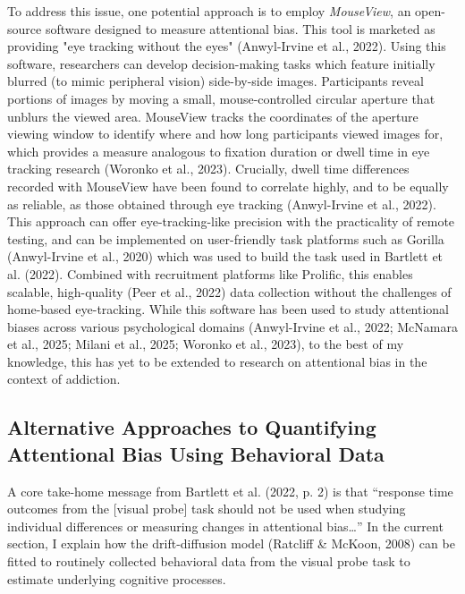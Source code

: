 \documentclass[authordate, reflection, issue]{jote-new-article}
\begin{document}
	To address this issue, one potential approach is to employ \emph{MouseView}, an open-source software designed to measure attentional bias. This tool is marketed as providing "eye tracking without the eyes" (Anwyl-Irvine et al., 2022). Using this software, researchers can develop decision-making tasks which feature initially blurred (to mimic peripheral vision) side-by-side images. Participants reveal portions of images by moving a small, mouse-controlled circular aperture that unblurs the viewed area. MouseView tracks the coordinates of the aperture viewing window to identify where and how long participants viewed images for, which provides a measure analogous to fixation duration or dwell time in eye tracking research (Woronko et al., 2023). Crucially, dwell time differences recorded with MouseView have been found to correlate highly, and to be equally as reliable, as those obtained through eye tracking (Anwyl-Irvine et al., 2022). This approach can offer eye-tracking-like precision with the practicality of remote testing, and can be implemented on user-friendly task platforms such as Gorilla (Anwyl-Irvine et al., 2020) which was used to build the task used in Bartlett et al. (2022). Combined with recruitment platforms like Prolific, this enables scalable, high-quality (Peer et al., 2022) data collection without the challenges of home-based eye-tracking. While this software has been used to study attentional biases across various psychological domains (Anwyl-Irvine et al., 2022; McNamara et al., 2025; Milani et al., 2025; Woronko et al., 2023), to the best of my knowledge, this has yet to be extended to research on attentional bias in the context of addiction.



	\subsection{Alternative Approaches to Quantifying Attentional Bias Using Behavioral Data}



	A core take-home message from Bartlett et al. (2022, p. 2) is that “response time outcomes from the [visual probe] task should not be used when studying individual differences or measuring changes in attentional bias…” In the current section, I explain how the drift-diffusion model (Ratcliff \& McKoon, 2008) can be fitted to routinely collected behavioral data from the visual probe task to estimate underlying cognitive processes.
\end{document}
